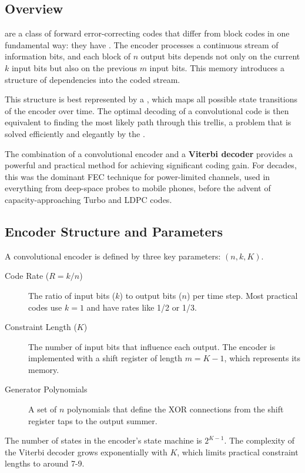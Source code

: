 \subsection{Overview}

 are a class of forward error-correcting codes that differ from block codes in one fundamental way: they have . The encoder processes a continuous stream of information bits, and each block of $n$ output bits depends not only on the current $k$ input bits but also on the previous $m$ input bits. This memory introduces a structure of dependencies into the coded stream.

This structure is best represented by a , which maps all possible state transitions of the encoder over time. The optimal decoding of a convolutional code is then equivalent to finding the most likely path through this trellis, a problem that is solved efficiently and elegantly by the .

\begin{keyconcept}
    The combination of a convolutional encoder and a \textbf{Viterbi decoder} provides a powerful and practical method for achieving significant coding gain. For decades, this was the dominant FEC technique for power-limited channels, used in everything from deep-space probes to mobile phones, before the advent of capacity-approaching Turbo and LDPC codes.
\end{keyconcept}


\subsection{Encoder Structure and Parameters}

A convolutional encoder is defined by three key parameters: $(n, k, K)$.
\begin{description}
    \item[Code Rate ($R=k/n$)] The ratio of input bits ($k$) to output bits ($n$) per time step. Most practical codes use $k=1$ and have rates like 1/2 or 1/3.
    \item[Constraint Length ($K$)] The number of input bits that influence each output. The encoder is implemented with a shift register of length $m=K-1$, which represents its memory.
    \item[Generator Polynomials] A set of $n$ polynomials that define the XOR connections from the shift register taps to the output summer.
\end{description}
The number of states in the encoder's state machine is $2^{K-1}$. The complexity of the Viterbi decoder grows exponentially with $K$, which limits practical constraint lengths to around 7-9.


